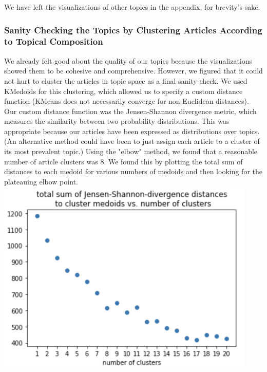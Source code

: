 \documentclass[11pt]{article}
\begin{document}
We have left the visualizations of other topics in the appendix, for brevity's sake.

\subsubsection{Sanity Checking the Topics by Clustering Articles According to Topical Composition}
We already felt good about the quality of our topics because the visualizations showed them to be cohesive and comprehensive. However, we figured that it could not hurt to cluster the articles in topic space as a final sanity-check.  We used KMedoids for this clustering, which allowed us to specify a custom distance function (KMeans does not necessarily converge for non-Euclidean distances).  Our custom distance function was the Jensen-Shannon divergence metric, which measures the similarity between two probability distributions.  This was appropriate because our articles have been expressed as distributions over topics.  (An alternative method could have been to just assign each article to a cluster of its most prevalent topic.)  Using the "elbow" method, we found that a reasonable number of article clusters was 8. We found this by plotting the total sum of distances to each medoid for various numbers of medoids and then looking for the plateauing elbow point.  \\

\includegraphics[width=350pt]{jensen.png} \\
\end{document}
